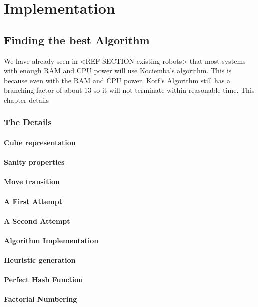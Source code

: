 \documentclass[titlepage]{report}[12pt]
\begin{document}
\chapter{Implementation}

\section{Finding the best Algorithm}
We have already seen in <REF SECTION existing robots> that most systems with enough RAM and CPU power will use Kociemba's algorithm. This is because even with the RAM and CPU power, Korf's Algorithm still has a branching factor of about 13 so it will not terminate within reasonable time. This chapter details

\subsection{The Details}
\subsubsection{Cube representation}
\subsubsection{Sanity properties}
\subsubsection{Move transition}
\subsubsection{A First Attempt}
\subsubsection{A Second Attempt}
\subsubsection{Algorithm Implementation}
\subsubsection{Heuristic generation}
\subsubsection{Perfect Hash Function}
\subsubsection{Factorial Numbering}
\end{document}
